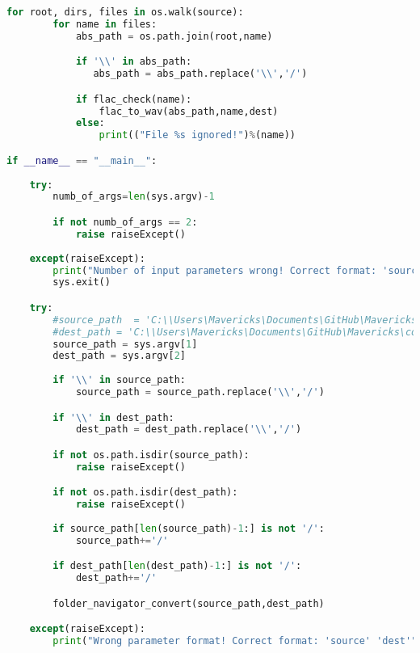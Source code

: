 \begin{lstlisting}[language=Python, flexiblecolumns=true, caption=FlacToWavPy code.]
    for root, dirs, files in os.walk(source):
        for name in files:
            abs_path = os.path.join(root,name)

            if '\\' in abs_path:
               abs_path = abs_path.replace('\\','/')

            if flac_check(name):
                flac_to_wav(abs_path,name,dest)
            else:
                print(("File %s ignored!")%(name))

if __name__ == "__main__":
    
    try: 
        numb_of_args=len(sys.argv)-1

        if not numb_of_args == 2: 
            raise raiseExcept()
            
    except(raiseExcept):
        print("Number of input parameters wrong! Correct format: 'source' 'dest'")
        sys.exit()

    try: 
        #source_path  = 'C:\\Users\Mavericks\Documents\GitHub\Mavericks\coding\PyTests\FolderNavTest\Testing_folder'             //these two could be used instead of sys.argv[1] and sys.argv[2]
        #dest_path = 'C:\\Users\Mavericks\Documents\GitHub\Mavericks\coding\PyTests\FolderNavTest\Results_folder'                // in order to run the code in an IDE or similar 
        source_path = sys.argv[1]
        dest_path = sys.argv[2]
        
        if '\\' in source_path:
            source_path = source_path.replace('\\','/')

        if '\\' in dest_path:
            dest_path = dest_path.replace('\\','/')

        if not os.path.isdir(source_path):
            raise raiseExcept()

        if not os.path.isdir(dest_path):
            raise raiseExcept()
        
        if source_path[len(source_path)-1:] is not '/':
            source_path+='/'

        if dest_path[len(dest_path)-1:] is not '/':
            dest_path+='/'

        folder_navigator_convert(source_path,dest_path)

    except(raiseExcept): 
        print("Wrong parameter format! Correct format: 'source' 'dest'")
\end{lstlisting}

